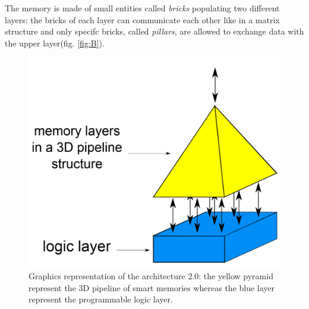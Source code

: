 The memory is made of small entities called \textit{bricks} populating two different layers: the bricks of each layer can communicate each other like in a matrix structure and only specifc bricks, called \textit{pillars}, are allowed to exchange data with the upper layer(fig. \ref{fig:B}). 
\begin{figure}[h!]
	\centering
	\includegraphics[width=\textwidth]{imm/iia/A.png}  
	\caption{Graphics representation of the architecture 2.0: the yellow pyramid represent the 3D pipeline of smart memories whereas the blue layer represent the programmable logic layer.} 
	\label{fig:A}
\end{figure}

